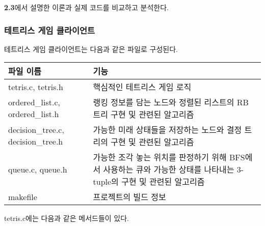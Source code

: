 \textbf{2.3}에서 설명한 이론과 실제 코드를 비교하고 분석한다.

\subsubsection{테트리스 게임 클라이언트}
테트리스 게임 클라이언트는 다음과 같은 파일로 구성된다. 

\begin{tabularx}{\linewidth}{l|X}
    파일 이름 & 기능 \\
    \hline
    tetris.c, tetris.h & 핵심적인 테트리스 게임 로직 \\
    \hline
    ordered_list.c, ordered_list.h & 랭킹 정보를 담는 노드와 정렬된 리스트의 RB 트리 구현 및 관련된 알고리즘 \\
    decision_tree.c, decision_tree.h & 가능한 미래 상태들을 저장하는 노드와 결정 트리의 구현 및 관련된 알고리즘 \\
    queue.c, queue.h & 가능한 조각 놓는 위치를 판정하기 위해 BFS에서 사용하는 큐와 가능한 상태를 나타내는 3-tuple의 구현 및 관련된 알고리즘 \\
    \hline
    makefile & 프로젝트의 빌드 정보 \\
\end{tabularx}

tetris.c에는 다음과 같은 메서드들이 있다.

